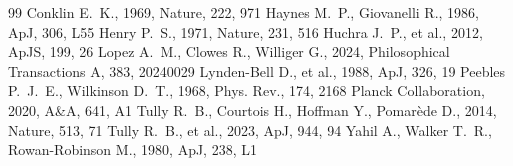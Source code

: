 \documentclass[11pt,a4paper]{article}
\begin{document}
\begin{thebibliography}{99}
 Conklin E.~K., 1969, Nature, 222, 971
 Haynes M.~P., Giovanelli R., 1986, ApJ, 306, L55
 Henry P.~S., 1971, Nature, 231, 516
 Huchra J.~P., et al., 2012, ApJS, 199, 26
 Lopez A.~M., Clowes R., Williger G., 2024, Philosophical Transactions A, 383, 20240029
 Lynden-Bell D., et al., 1988, ApJ, 326, 19
 Peebles P.~J.~E., Wilkinson D.~T., 1968, Phys. Rev., 174, 2168
 Planck Collaboration, 2020, A\&A, 641, A1
 Tully R.~B., Courtois H., Hoffman Y., Pomar\`ede D., 2014, Nature, 513, 71
 Tully R.~B., et al., 2023, ApJ, 944, 94
 Yahil A., Walker T.~R., Rowan-Robinson M., 1980, ApJ, 238, L1
\end{thebibliography}
\end{document}
